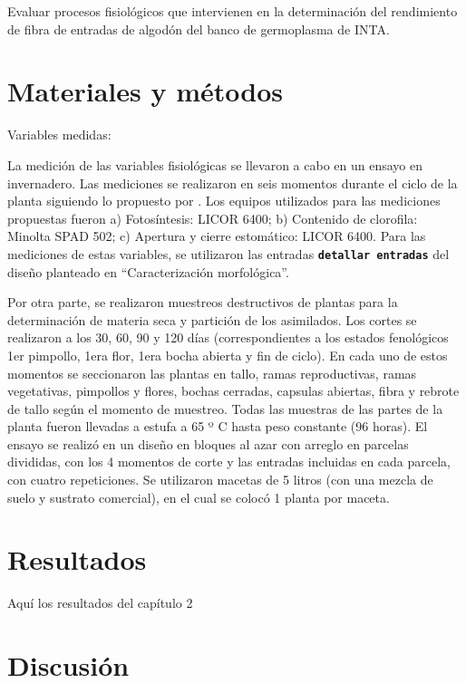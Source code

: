 \documentclass[12pt,oneside]{reedthesis}
\begin{document}
Evaluar procesos fisiológicos que intervienen en la determinación del rendimiento de fibra de entradas de algodón del banco de germoplasma de INTA.

\section{Materiales y métodos}\label{materiales-y-muxe9todos-1}

Variables medidas:

La medición de las variables fisiológicas se llevaron a cabo en un ensayo en invernadero. Las mediciones se realizaron en seis momentos durante el ciclo de la planta siguiendo lo propuesto por \autocite{luo2017}. Los equipos utilizados para las mediciones propuestas fueron a) Fotosíntesis: LICOR 6400; b) Contenido de clorofila: Minolta SPAD 502; c) Apertura y cierre estomático: LICOR 6400. Para las mediciones de estas variables, se utilizaron las entradas \textbf{\texttt{detallar\ entradas}} del diseño planteado en ``Caracterización morfológica''.

Por otra parte, se realizaron muestreos destructivos de plantas para la determinación de materia seca y partición de los asimilados. Los cortes se realizaron a los 30, 60, 90 y 120 días (correspondientes a los estados fenológicos 1er pimpollo, 1era flor, 1era bocha abierta y fin de ciclo). En cada uno de estos momentos se seccionaron las plantas en tallo, ramas reproductivas, ramas vegetativas, pimpollos y flores, bochas cerradas, capsulas abiertas, fibra y rebrote de tallo según el momento de muestreo. Todas las muestras de las partes de la planta fueron llevadas a estufa a 65 º C hasta peso constante (96 horas). El ensayo se realizó en un diseño en bloques al azar con arreglo en parcelas divididas, con los 4 momentos de corte y las entradas incluidas en cada parcela, con cuatro repeticiones. Se utilizaron macetas de 5 litros (con una mezcla de suelo y sustrato comercial), en el cual se colocó 1 planta por maceta.

\section{Resultados}\label{resultados-1}

Aquí los resultados del capítulo 2

\section{Discusión}\label{discusiuxf3n-1}
\end{document}
